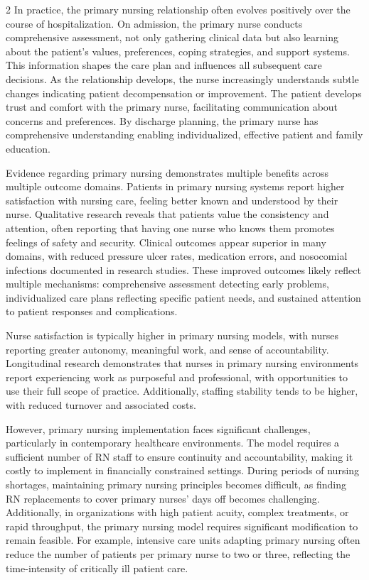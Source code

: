 \documentclass[12pt]{article}
\begin{document}
\begin{multicols}{2}
In practice, the primary nursing relationship often evolves positively over the course of hospitalization. On admission, the primary nurse conducts comprehensive assessment, not only gathering clinical data but also learning about the patient's values, preferences, coping strategies, and support systems. This information shapes the care plan and influences all subsequent care decisions. As the relationship develops, the nurse increasingly understands subtle changes indicating patient decompensation or improvement. The patient develops trust and comfort with the primary nurse, facilitating communication about concerns and preferences. By discharge planning, the primary nurse has comprehensive understanding enabling individualized, effective patient and family education.

Evidence regarding primary nursing demonstrates multiple benefits across multiple outcome domains. Patients in primary nursing systems report higher satisfaction with nursing care, feeling better known and understood by their nurse. Qualitative research reveals that patients value the consistency and attention, often reporting that having one nurse who knows them promotes feelings of safety and security. Clinical outcomes appear superior in many domains, with reduced pressure ulcer rates, medication errors, and nosocomial infections documented in research studies. These improved outcomes likely reflect multiple mechanisms: comprehensive assessment detecting early problems, individualized care plans reflecting specific patient needs, and sustained attention to patient responses and complications.

Nurse satisfaction is typically higher in primary nursing models, with nurses reporting greater autonomy, meaningful work, and sense of accountability. Longitudinal research demonstrates that nurses in primary nursing environments report experiencing work as purposeful and professional, with opportunities to use their full scope of practice. Additionally, staffing stability tends to be higher, with reduced turnover and associated costs.

However, primary nursing implementation faces significant challenges, particularly in contemporary healthcare environments. The model requires a sufficient number of RN staff to ensure continuity and accountability, making it costly to implement in financially constrained settings. During periods of nursing shortages, maintaining primary nursing principles becomes difficult, as finding RN replacements to cover primary nurses' days off becomes challenging. Additionally, in organizations with high patient acuity, complex treatments, or rapid throughput, the primary nursing model requires significant modification to remain feasible. For example, intensive care units adapting primary nursing often reduce the number of patients per primary nurse to two or three, reflecting the time-intensity of critically ill patient care.


\end{multicols}
\end{document}
